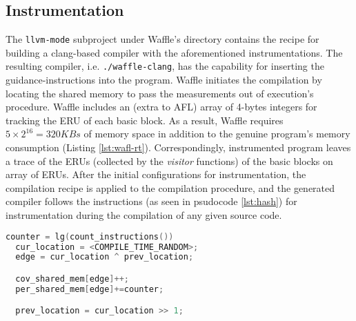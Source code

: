 \subsection{Instrumentation}
\label{subsec:inst}


The \texttt{llvm-mode} subproject under Waffle's directory contains the recipe for building a clang-based compiler with the aforementioned instrumentations. The resulting compiler, i.e. \texttt{./waffle-clang}, has the capability for inserting the guidance-instructions into the program. Waffle initiates the compilation by locating the shared memory to pass the measurements out of execution's procedure. Waffle includes an (extra to AFL) array of 4-bytes integers for tracking the ERU of each basic block. As a result, Waffle requires $5\times2^{16}=320KBs$ of memory space in addition to the genuine program's memory consumption (Listing \ref{lst:wafl-rt}). Correspondingly, instrumented program leaves a trace of the ERUs (collected by the \textit{visitor} functions) of the basic blocks on array of ERUs. After the initial configurations for instrumentation, the compilation recipe is applied to the compilation procedure, and the generated compiler follows the instructions (as seen in psudocode \ref{lst:hash}) for instrumentation during the compilation of any given source code.

\begin{lstlisting}[language=C++,style=CodeStyle,label={lst:hash},caption={Select element and update in shared\_mem}]
  counter = lg(count_instructions())
  cur_location = <COMPILE_TIME_RANDOM>;
  edge = cur_location ^ prev_location;

  cov_shared_mem[edge]++;
  per_shared_mem[edge]+=counter;

  prev_location = cur_location >> 1;
\end{lstlisting}
  
  


